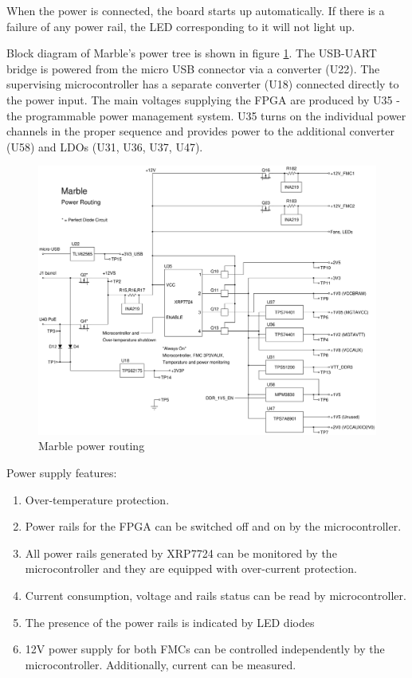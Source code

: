 \documentclass[12pt,oneside,a4]{article}
\begin{document}
When the power is connected, the board starts up automatically. If there is a failure of any power rail, the LED corresponding to it will not light up.

Block diagram of Marble's power tree is shown in figure \ref{pwr}. The USB-UART bridge is powered from the micro USB connector via a converter (U22). The supervising microcontroller has a separate converter (U18) connected directly to the power input. The main voltages supplying the FPGA are produced by U35 - the programmable power management system. U35 turns on the individual power channels in the proper sequence and provides power to the additional converter (U58) and LDOs (U31, U36, U37, U47).

\begin{figure}[H]
\begin{center}
\includegraphics[width=1.1\linewidth]{m_power.png}
 \caption{Marble power routing}\label{pwr}
\end{center}
\end{figure}

Power supply features:
\begin{enumerate}
	\item Over-temperature protection.
	\item Power rails for the FPGA can be switched off and on by the microcontroller.
	\item All power rails generated by XRP7724 can be monitored by the microcontroller and they are equipped with over-current protection.
	\item Current consumption, voltage and rails status can be read by microcontroller.
	\item The presence of the power rails is indicated by LED diodes
	\item 12V power supply for both FMCs can be controlled independently by the microcontroller. Additionally,  current can be measured.
\end{enumerate}
\end{document}
